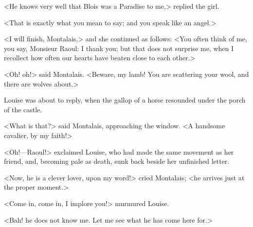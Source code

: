 <He knows very well that Blois was a Paradise to me,> replied the girl.

<That is exactly what you mean to say; and you speak like an angel.>

<I will finish, Montalais,> and she continued as follows: <You often think of me, you say, Monsieur Raoul: I thank you; but that does not surprise me, when I recollect how often our hearts have beaten close to each other.>

<Oh! oh!> said Montalais. <Beware, my lamb! You are scattering your wool, and there are wolves about.>

Louise was about to reply, when the gallop of a horse resounded under the porch of the castle.

<What is that?> said Montalais, approaching the window. <A handsome cavalier, by my faith!>

<Oh!—Raoul!> exclaimed Louise, who had made the same movement as her friend, and, becoming pale as death, sunk back beside her unfinished letter.

<Now, he is a clever lover, upon my word!> cried Montalais; <he arrives just at the proper moment.>

<Come in, come in, I implore you!> murmured Louise.

<Bah! he does not know me. Let me see what he has come here for.> 